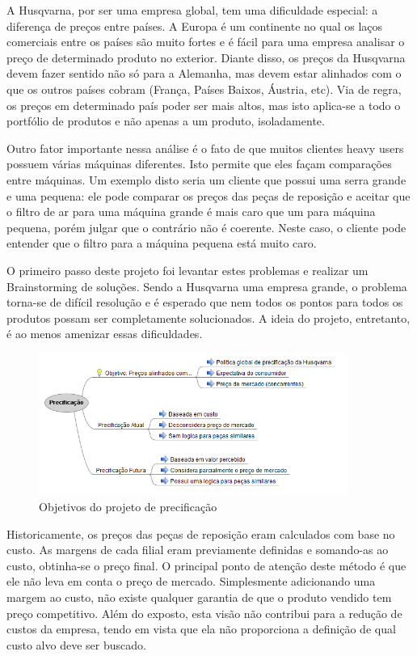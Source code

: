 \documentclass[12pt]{article}
\begin{document}
	A Husqvarna, por ser uma empresa global, tem uma dificuldade especial: a diferença de preços entre países. A Europa é um continente no qual os laços comerciais entre os países são muito fortes e é fácil para uma empresa analisar o preço de determinado produto no exterior. Diante disso, os preços da Husqvarna devem fazer sentido não só para a Alemanha, mas devem estar alinhados com o que os outros países cobram (França, Países Baixos, Áustria, etc). Via de regra, os preços em determinado país poder ser mais altos, mas isto aplica-se a todo o portfólio de produtos e não apenas a um produto, isoladamente.

	Outro fator importante nessa análise é o fato de que muitos clientes heavy users possuem várias máquinas diferentes. Isto permite que eles façam comparações entre máquinas. Um exemplo disto seria um cliente que possui uma serra grande e uma pequena: ele pode comparar os preços das peças de reposição e aceitar que o filtro de ar para uma máquina grande é mais caro que um para máquina pequena, porém julgar que o contrário não é coerente. Neste caso, o cliente pode entender que o filtro para a máquina pequena está muito caro.

	O primeiro passo deste projeto foi levantar estes problemas e realizar um Brainstorming de soluções. Sendo a Husqvarna uma empresa grande, o problema torna-se de difícil resolução e é esperado que nem todos os pontos para todos os produtos possam ser completamente solucionados. A ideia do projeto, entretanto, é ao menos amenizar essas dificuldades.

\begin{figure}[h!]
	\centering
	\includegraphics[width=0.9\textwidth]{img/pricing-pt.png}
	\caption{Objetivos do projeto de precificação}
	\label{fig:pricing}
\end{figure}

	Historicamente, os preços das peças de reposição eram calculados com base no custo. As margens de cada filial eram previamente definidas e somando-as ao custo, obtinha-se o preço final. O principal ponto de atenção deste método é que ele não leva em conta o preço de mercado. Simplesmente adicionando uma margem ao custo, não existe qualquer garantia de que o produto vendido tem preço competitivo. Além do exposto, esta visão não contribui para a redução de custos da empresa, tendo em vista que ela não proporciona a definição de qual custo alvo deve ser buscado.
\end{document}
